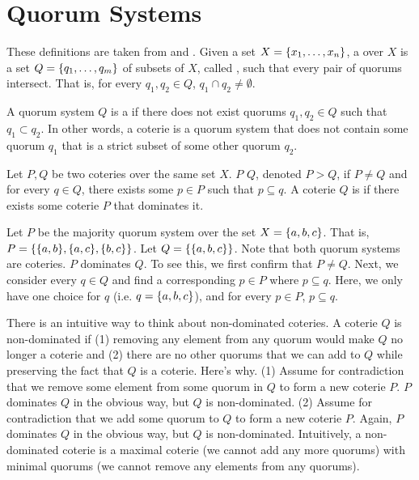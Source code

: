 \section{Quorum Systems}
These definitions are taken from \cite{naor1998load} and
\cite{vukolic2013origin}.
%
Given a set $X = \{x_1, \ldots, x_n\}$, a  over $X$ is
a set $Q = \{q_1, \ldots, q_m\}$ of subsets of $X$, called ,
such that every pair of quorums intersect. That is, for every $q_1, q_2 \in
Q$, $q_1 \cap q_2 \neq \emptyset$.

A quorum system $Q$ is a  if there does not exist quorums
$q_1, q_2 \in Q$ such that $q_1 \subset q_2$. In other words, a coterie is a
quorum system that does not contain some quorum $q_1$ that is a strict subset
of some other quorum $q_2$.

Let $P, Q$ be two coteries over the same set $X$. $P$  $Q$,
denoted $P > Q$, if $P \neq Q$ and for every $q \in Q$, there exists some $p
\in P$ such that $p \subseteq q$. A coterie $Q$ is  if there
exists some coterie $P$ that dominates it.

\begin{example}
  Let $P$ be the majority quorum system over the set $X = \{a, b, c\}$. That
  is, $P = \{\{a, b\}, \{a, c\}, \{b, c\}\}$. Let $Q = \{\{a, b,
  c\}\}$. Note that both quorum systems are coteries. $P$ dominates $Q$. To see
  this, we first confirm that $P \neq Q$. Next, we consider every $q \in Q$ and
  find a corresponding $p \in P$ where $p \subseteq q$. Here, we only have one
  choice for $q$ (i.e. $q = \{a, b, c\}$), and for every $p \in P$, $p
  \subseteq q$.
\end{example}

There is an intuitive way to think about non-dominated coteries. A coterie $Q$
is non-dominated if (1) removing any element from any quorum would make $Q$ no
longer a coterie and (2) there are no other quorums that we can add to $Q$
while preserving the fact that $Q$ is a coterie. Here's why. (1) Assume for
contradiction that we remove some element from some quorum in $Q$ to
form a new coterie $P$. $P$ dominates $Q$ in the obvious way, but $Q$ is
non-dominated. (2) Assume for contradiction that we add some quorum to $Q$ to
form a new coterie $P$. Again, $P$ dominates $Q$ in the obvious way, but $Q$ is
non-dominated. Intuitively, a non-dominated coterie is a maximal coterie (we
cannot add any more quorums) with minimal quorums (we cannot remove any
elements from any quorums).

